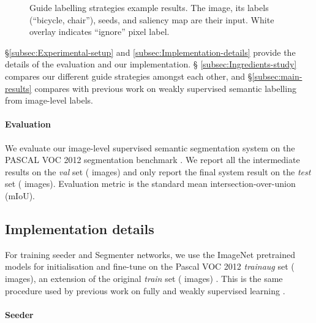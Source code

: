 \documentclass[british,10pt,twocolumn,letterpaper]{article}
\newcommand{\lyxdot}{.}
\begin{document}
\begin{figure*}
\begin{centering}
{}\hspace*{\fill}\hspace*{\fill}
\par\end{centering}
\caption{\label{fig:combination-strategies-examples}Guide labelling strategies
example results. The image, its labels (``bicycle, chair''), seeds,
and saliency map are their input. White overlay indicates ``ignore''
pixel label.}
\end{figure*}
\noindent
\S \ref{subsec:Experimental-setup} and \ref{subsec:Implementation-details}
provide the details of the evaluation and our implementation. \S
\ref{subsec:Ingredients-study} compares our different guide strategies
amongst each other, and \S \ref{subsec:main-results} compares
with previous work on weakly supervised semantic labelling from image-level
labels.

\paragraph{\label{subsec:Experimental-setup}Evaluation}

We evaluate our image-level supervised semantic segmentation system
on the PASCAL VOC 2012 segmentation benchmark \cite{pascal-voc-2012}.
We report all the intermediate results on the \textit{val}\emph{ }set
( images) and only report the final system result on the
\textit{test} set ( images). Evaluation metric is the standard mean
intersection-over-union (mIoU).


\subsection{\label{subsec:Implementation-details}Implementation details}

\noindent
For training seeder and Segmenter networks, we use the
ImageNet \cite{imagenet_cvpr09} pretrained models for initialisation
and fine-tune on the Pascal VOC 2012 \emph{trainaug} set (
images), an extension of the original \textit{train} set ( images)
\cite{pascal-voc-2012,Hariharan2011Iccv}. This is the same procedure
used by previous work on fully \cite{Chen2016ArxivDeeplabv2} and
weakly supervised learning \cite{kolesnikov2016seed}.

\paragraph{Seeder}
\end{document}
